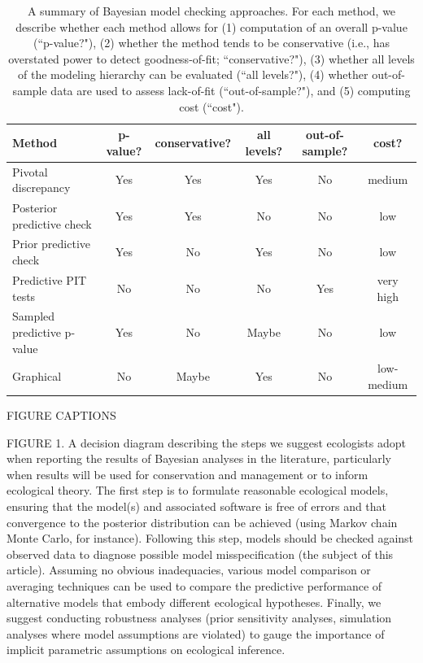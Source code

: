 \documentclass[12pt,english]{article}
\begin{document}
\begin{spacing}{1.9}
    \begin{table}[ht]
      \caption{A summary of Bayesian model checking approaches.  For each method, we describe whether each method allows for (1) computation of an overall p-value (``p-value?"), (2) whether the method tends to be conservative (i.e., has overstated power to detect goodness-of-fit; ``conservative?"), (3) whether all levels of the modeling hierarchy can be evaluated (``all levels?"), (4) whether out-of-sample data are used to assess lack-of-fit (``out-of-sample?"), and (5) computing cost (``cost").
      }
      \label{tab:discrepancy}
      \centering
      \begin{tabular}{lccccc}
        \hline
        Method & p-value? & conservative? & all levels? & out-of-sample?  & cost?\\
        \hline
        Pivotal discrepancy & Yes & Yes & Yes & No & medium \\
        Posterior predictive check & Yes & Yes & No & No & low \\
        Prior predictive check & Yes & No & Yes & No & low \\
        Predictive PIT tests & No & No & No & Yes & very high \\
        Sampled predictive p-value & Yes & No & Maybe & No & low \\
        Graphical & No & Maybe & Yes & No & low-medium \\
        \hline
      \end{tabular}
    \end{table}
    \pagebreak

    FIGURE CAPTIONS

    FIGURE 1.  A decision diagram describing the steps we suggest
    ecologists adopt when reporting the results of Bayesian analyses
    in the literature, particularly when results will be used for
    conservation and management or to inform ecological theory.  The
    first step is to formulate reasonable ecological models, ensuring
    that the model(s) and associated software is free of errors and
    that convergence to the posterior distribution can be achieved
    (using Markov chain Monte Carlo, for instance).  Following this
    step, models should be checked against observed data to diagnose
    possible model misspecification (the subject of this article).
    Assuming no obvious inadequacies, various model comparison or
    averaging techniques can be used to compare the predictive
    performance of alternative models that embody different ecological
    hypotheses.  Finally, we suggest conducting robustness analyses
    (prior sensitivity analyses, simulation analyses where model
    assumptions are violated) to gauge the importance of implicit
    parametric assumptions on ecological inference.


\end{spacing}
\end{document}
